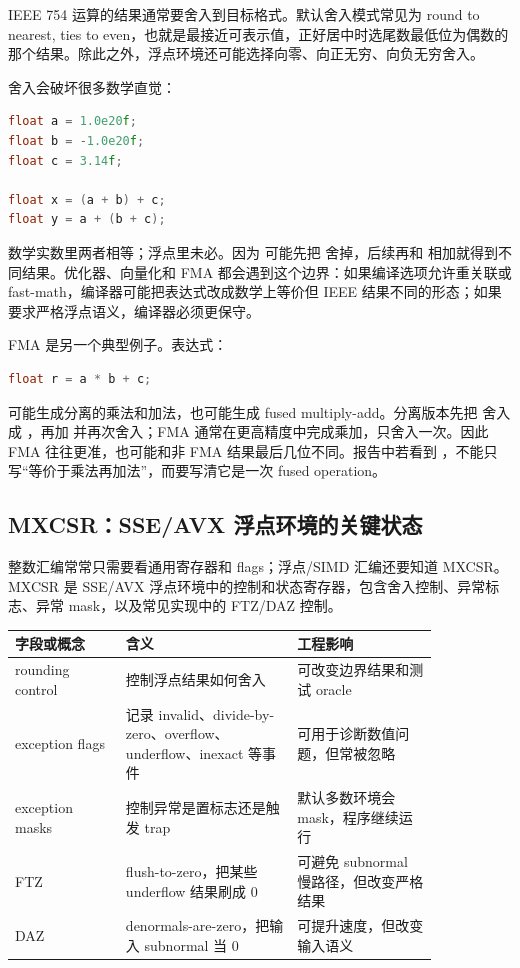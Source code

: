 IEEE 754 运算的结果通常要舍入到目标格式。默认舍入模式常见为 round to nearest, ties to even，也就是最接近可表示值，正好居中时选尾数最低位为偶数的那个结果。除此之外，浮点环境还可能选择向零、向正无穷、向负无穷舍入。

舍入会破坏很多数学直觉：

\begin{lstlisting}[language=C++]
float a = 1.0e20f;
float b = -1.0e20f;
float c = 3.14f;

float x = (a + b) + c;
float y = a + (b + c);
\end{lstlisting}

数学实数里两者相等；浮点里未必。因为  可能先把  舍掉，后续再和  相加就得到不同结果。优化器、向量化和 FMA 都会遇到这个边界：如果编译选项允许重关联或 fast-math，编译器可能把表达式改成数学上等价但 IEEE 结果不同的形态；如果要求严格浮点语义，编译器必须更保守。

FMA 是另一个典型例子。表达式：

\begin{lstlisting}[language=C++]
float r = a * b + c;
\end{lstlisting}

可能生成分离的乘法和加法，也可能生成 fused multiply-add。分离版本先把  舍入成 ，再加  并再次舍入；FMA 通常在更高精度中完成乘加，只舍入一次。因此 FMA 往往更准，也可能和非 FMA 结果最后几位不同。报告中若看到 ，不能只写“等价于乘法再加法”，而要写清它是一次 fused operation。

\subsection{MXCSR：SSE/AVX 浮点环境的关键状态}

整数汇编常常只需要看通用寄存器和 flags；浮点/SIMD 汇编还要知道 MXCSR。MXCSR 是 SSE/AVX 浮点环境中的控制和状态寄存器，包含舍入控制、异常标志、异常 mask，以及常见实现中的 FTZ/DAZ 控制。

\begin{center}
\small
\begin{tabular}{p{0.22\linewidth}p{0.34\linewidth}p{0.28\linewidth}}
\toprule
字段或概念 & 含义 & 工程影响 \\
\midrule
rounding control & 控制浮点结果如何舍入 & 可改变边界结果和测试 oracle \\
exception flags & 记录 invalid、divide-by-zero、overflow、underflow、inexact 等事件 & 可用于诊断数值问题，但常被忽略 \\
exception masks & 控制异常是置标志还是触发 trap & 默认多数环境会 mask，程序继续运行 \\
FTZ & flush-to-zero，把某些 underflow 结果刷成 0 & 可避免 subnormal 慢路径，但改变严格结果 \\
DAZ & denormals-are-zero，把输入 subnormal 当 0 & 可提升速度，但改变输入语义 \\
\bottomrule
\end{tabular}
\end{center}

